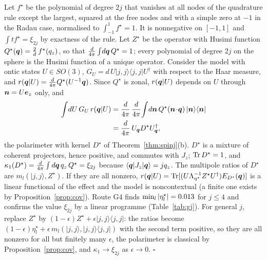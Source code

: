 Let $f^\star$ be the polynomial of degree $2j$ that vanishes at all nodes of the quadrature rule except the largest, squared at the free nodes and with a simple zero at $-1$ in the Radau case, normalised to $\int_{-1}^1f^\star=1$. It is nonnegative on $[-1,1]$ and $\int tf^\star=\xi_{2j}$ by exactness of the rule. Let $Z^\star$ be the operator with Husimi function $Q^\star(\bm{q})=\tfrac2d\,f^\star(q_z)$, so that $\tfrac{d}{4\pi}\int\!d\bm{q}\,Q^\star=1$; every polynomial of degree $2j$ on the sphere is the Husimi function of a unique operator. Consider the model with ontic states $U\in SO(3)$, $G_U=d\,U|j,j\rangle\langle j,j|U^\dagger$ with respect to the Haar measure, and $r(\bm{q}|U)=\tfrac{d}{4\pi}Q^\star(U^{-1}\bm{q})$. Since $Q^\star$ is zonal, $r(\bm{q}|U)$ depends on $U$ through $\bm{n}=U\bm{e}_z$ only, and
\begin{equation}
\begin{aligned}
\int\!dU\,G_U\,r(\bm{q}|U)&=\frac{d}{4\pi}\,\frac{d}{4\pi}\!\int\!d\bm{n}\,Q^\star(\bm{n}\!\cdot\!\bm{q})\,|\bm{n}\rangle\langle\bm{n}|\\
&=\frac{d}{4\pi}\,U_{\bm{q}}D^\star U_{\bm{q}}^\dagger ,
\end{aligned}
\end{equation}
the polarimeter with kernel $D^\star$ of Theorem~\ref{thm:spinj}(b). $D^\star$ is a mixture of coherent projectors, hence positive, and commutes with $J_z$; $\operatorname{Tr} D^\star=1$, and $\kappa_1(D^\star)=\tfrac{d}{4\pi}\int d\bm{q}\,q_z\,Q^\star=\xi_{2j}$ because $\langle\bm{q}|J_z|\bm{q}\rangle=jq_z$. The multipole ratios of $D^\star$ are $m_l(|j,j\rangle,Z^\star)$. If they are all nonzero, $r(\bm{q}|U)=\operatorname{Tr}[(U\Lambda_{\eta^\star}^{-1}Z^\star U^\dagger)E_{D^\star}(\bm{q})]$ is a linear functional of the effect and the model is noncontextual (a finite one exists by Proposition~\ref{prop:cov}). Route G4 finds $\min_l|\eta^\star_l|=0.013$ for $j\le4$ and confirms the value $\xi_{2j}$ by a linear programme (Table~\ref{tab:gj}). For general $j$, replace $Z^\star$ by $(1-\epsilon)Z^\star+\epsilon|j,j\rangle\langle j,j|$: the ratios become $(1-\epsilon)\eta^\star_l+\epsilon\,m_l(|j,j\rangle,|j,j\rangle\langle j,j|)$ with the second term positive, so they are all nonzero for all but finitely many $\epsilon$, the polarimeter is classical by Proposition~\ref{prop:cov}, and $\kappa_1\to\xi_{2j}$ as $\epsilon\to0$. \hfill$\square$
